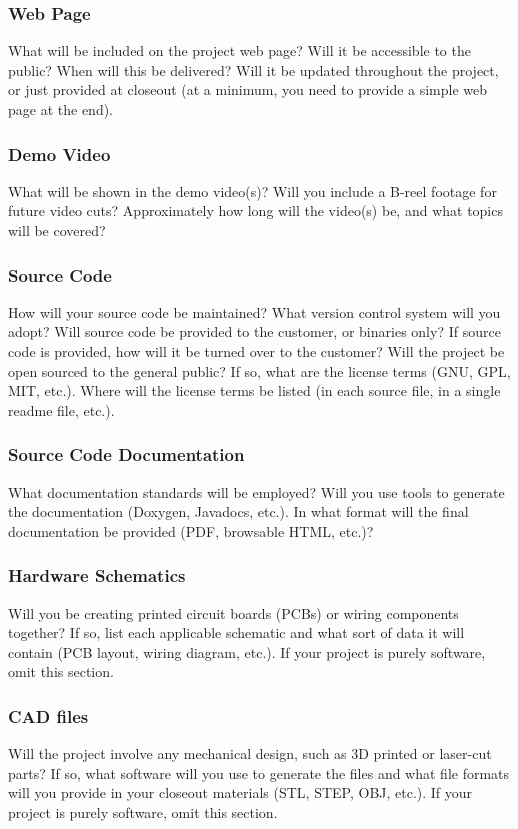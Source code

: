 \subsubsection{Web Page}
What will be included on the project web page? Will it be accessible to the public? When will this be delivered? Will it be updated throughout the project, or just provided at closeout (at a minimum, you need to provide a simple web page at the end).

\subsubsection{Demo Video}
What will be shown in the demo video(s)? Will you include a B-reel footage for future video cuts? Approximately how long will the video(s) be, and what topics will be covered?

\subsubsection{Source Code}
How will your source code be maintained? What version control system will you adopt? Will source code be provided to the customer, or binaries only? If source code is provided, how will it be turned over to the customer? Will the project be open sourced to the general public? If so, what are the license terms (GNU, GPL, MIT, etc.). Where will the license terms be listed (in each source file, in a single readme file, etc.).

\subsubsection{Source Code Documentation}
What documentation standards will be employed? Will you use tools to generate the documentation (Doxygen, Javadocs, etc.). In what format will the final documentation be provided (PDF, browsable HTML, etc.)?

\subsubsection{Hardware Schematics}
Will you be creating printed circuit boards (PCBs) or wiring components together? If so, list each applicable schematic and what sort of data it will contain (PCB layout, wiring diagram, etc.). If your project is purely software, omit this section.

\subsubsection{CAD files}
Will the project involve any mechanical design, such as 3D printed or laser-cut parts? If so, what software will you use to generate the files and what file formats will you provide in your closeout materials (STL, STEP, OBJ, etc.). If your project is purely software, omit this section.

